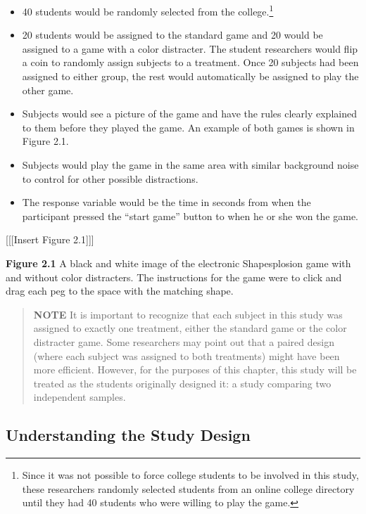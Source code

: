 \documentclass[
]{report}
\providecommand{\tightlist}{%
  \setlength{\itemsep}{0pt}\setlength{\parskip}{0pt}}
\begin{document}
\begin{itemize}
\tightlist
\item
  40 students would be randomly selected from the college.\footnote{Since it was not possible to force college students to be involved in this study, these researchers randomly selected students from an online college directory until they had 40 students who were willing to play the game.}
\item
  20 students would be assigned to the standard game and 20 would be assigned to a game with a color
  distracter. The student researchers would flip a coin to randomly assign subjects to a treatment. Once
  20 subjects had been assigned to either group, the rest would automatically be assigned to play the
  other game.
\item
  Subjects would see a picture of the game and have the rules clearly explained to them before they
  played the game. An example of both games is shown in Figure 2.1.
\item
  Subjects would play the game in the same area with similar background noise to control for other
  possible distractions.
\item
  The response variable would be the time in seconds from when the participant pressed the ``start
  game'' button to when he or she won the game.
\end{itemize}

{[}{[}{[}Insert Figure 2.1{]}{]}{]}

\textbf{Figure 2.1} A black and white image of the electronic Shapesplosion game
with and without color distracters. The instructions for the game were to
click and drag each peg to the space with the matching shape.

\begin{quote}
\textbf{NOTE}
It is important to recognize that each subject in this study was assigned to exactly one treatment, either the standard game or the color distracter game. Some researchers may point out that a paired design (where each subject was assigned to both treatments) might have been more efficient. However, for the purposes of this chapter, this study will be treated as the students originally designed it: a study comparing two independent samples.
\end{quote}

\subsection{Understanding the Study Design}\label{understanding-the-study-design}
\end{document}
